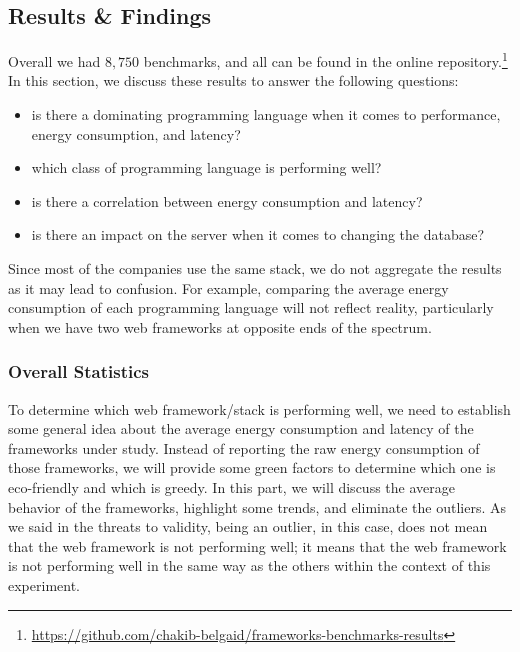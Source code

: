 \subsection{Results \& Findings}
Overall we had $8,750$ benchmarks, and all can be found in the online repository.\footnote{\url{https://github.com/chakib-belgaid/frameworks-benchmarks-results}}
In this section, we discuss these results to answer the following questions:
\begin{itemize}
    \item is there a dominating programming language when it comes to performance, energy consumption, and latency?
    \item which class of programming language is performing well?
    \item is there a correlation between energy consumption and latency?
    \item is there an impact on the server when it comes to changing the database?
\end{itemize}

Since most of the companies use the same stack, we do not aggregate the results as it may lead to confusion.
For example, comparing the average energy consumption of each programming language will not reflect reality, particularly when we have two web frameworks at opposite ends of the spectrum.

\subsubsection{Overall Statistics}
To determine which web framework/stack is performing well, we need to establish some general idea about the average energy consumption and latency of the frameworks under study.
Instead of reporting the raw energy consumption of those frameworks, we will provide some green factors to determine which one is eco-friendly and which is greedy.
In this part, we will discuss the average behavior of the frameworks, highlight some trends, and eliminate the outliers.
As we said in the threats to validity, being an outlier, in this case, does not mean that the web framework is not performing well; it means that the web framework is not performing well in the same way as the others within the context of this experiment.

